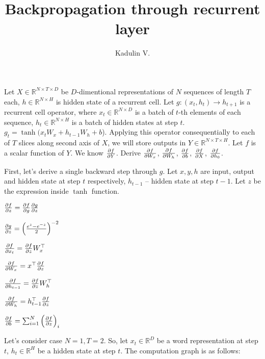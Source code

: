 \documentclass[12pt]{article}
\begin{document}
\title{Backpropagation through recurrent layer}
\author{Kadulin V.}
\maketitle

Let $X \in \mathbb{R}^{N \times T \times D}$ be $D$-dimentional representations of $N$ sequences of length $T$ each, $h \in \mathbb{R}^{N \times H}$ is hidden state of a recurrent cell. Let $g: (x_t, h_t) \rightarrow h_{t+1}$ is a recurrent cell operator, where $x_t \in \mathbb{R}^{N \times D}$ is a batch of $t$-th elements of each sequence, $h_t \in \mathbb{R}^{N \times H}$ is a batch of hidden states at step $t$. $g_t = \tanh(x_t W_x + h_{t-1} W_h + b$). Applying this operator consequentially to each of $T$ slices along second axis of $X$, we will store outputs in $Y \in \mathbb{R}^{N \times T \times H}$. Let $f$ is a scalar function of $Y$. We know $\pdv{f}{Y}$. Derive $\pdv{f}{W_x}$, $\pdv{f}{W_h}$, $\pdv{f}{b}$, $\pdv{f}{X}$, $\pdv{f}{h_0}$.

First, let's derive a single backward step through $g$. Let $x, y, h$ are input, output and hidden state at step $t$ respectively, $h_{t-1}$ -- hidden state at step $t-1$. Let $z$ be the expression inside $\tanh$ function.

$\pdv{f}{z} = \pdv{f}{g} \pdv{g}{z}$

$\pdv{g}{z} = \left( \frac{e^{z} - e^{-z}}{2} \right)^{-2}$

$\pdv{f}{x_t} = \pdv{f}{z} W_x^\top$

$\pdv{f}{W_x} = x^\top \pdv{f}{z}$

$\pdv{f}{h_{t-1}} = \pdv{f}{z} W_h^\top$

$\pdv{f}{W_h} = h_{t-1}^\top \pdv{f}{z}$

$\pdv{f}{b} = \sum_{i=1}^{N} \pdv{f}{z}_i$

Let's consider case $N = 1, T = 2$. So, let $x_t \in \mathbb{R}^D$ be a word representation at step $t$, $h_t \in \mathbb{R}^H$ be a hidden state at step $t$. The computation graph is as follows:

\end{document}
